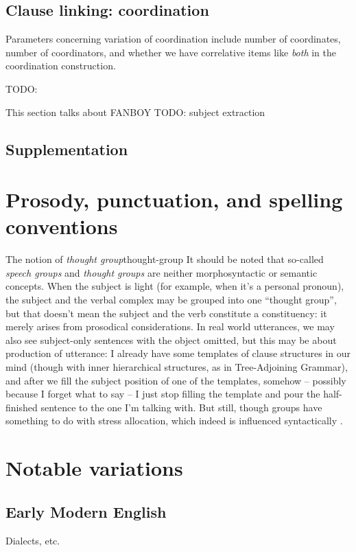 \documentclass[UTF8, a4paper, oneside, scheme=plain, 12pt]{ctexbook}
\newcommand*{\citepage}[1]{p.~{#1}}
\newcommand*{\term}[1]{\emph{#1}}
\newcommand{\form}[1]{\emph{#1}}
\begin{document}
\section{Clause linking: coordination}\label{sec:clause-linking.coordination}

Parameters concerning variation of coordination 
include number of coordinates, 
number of coordinators,
and whether we have correlative items like \form{both} in the coordination construction.

TODO: \citet[\citepage{1276}]{cgel}

This section talks about FANBOY
TODO: subject extraction

\section{Supplementation}\label{sec:clause-linking.supplementation}


\chapter{Prosody, punctuation, and spelling conventions}

\begin{infobox}{The notion of \term{thought group}}{thought-group}
    It should be noted that so-called \term{speech groups}
    and \term{thought groups}
    are neither morphosyntactic or semantic concepts.
    When the subject is light (for example, when it's a personal pronoun),
    the subject and the verbal complex may be grouped into one ``thought group'',
    but that doesn't mean the subject and the verb constitute a constituency:
    it merely arises from prosodical considerations.
    In real world utterances, 
    we may also see subject-only sentences with the object omitted,
    but this may be about production of utterance:
    I already have some templates of clause structures in our mind
    (though with inner hierarchical structures, as in Tree-Adjoining Grammar),
    and after we fill the subject position of one of the templates,
    somehow -- possibly because I forget what to say -- 
    I just stop filling the template and pour the half-finished sentence 
    to the one I'm talking with.
    But still, though groups have something to do with stress allocation,
    which indeed is influenced syntactically \citep[\citepage{7}]{kahnemuyipour2009syntax}. 
\end{infobox}

\chapter{Notable variations}

\section{Early Modern English}

Dialects, etc.




\end{document}
